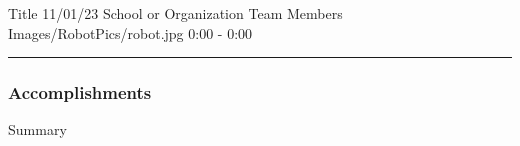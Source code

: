 \insertmeeting
	{Title} 
	{11/01/23} 
	{School or Organization}
	{Team Members}
	{Images/RobotPics/robot.jpg}
	{0:00 - 0:00}


\noindent\hfil\rule{\textwidth}{.4pt}\hfil

\subsubsection*{Accomplishments}
Summary

